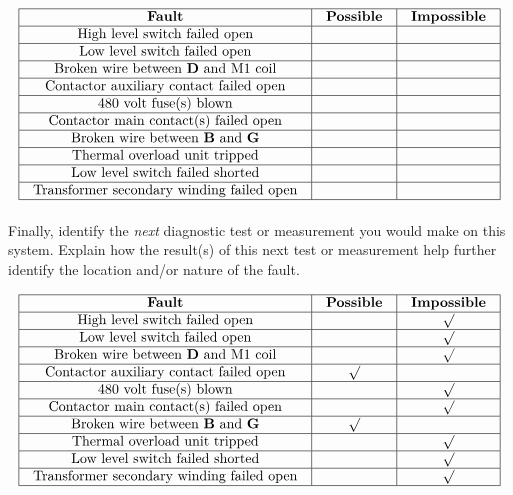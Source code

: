 $$\vbox{\offinterlineskip
\halign{\strut
\vrule \quad\hfil # \ \hfil & 
\vrule \quad\hfil # \ \hfil & 
\vrule \quad\hfil # \ \hfil \vrule \cr
\noalign{\hrule}
%
{\bf Fault} & {\bf Possible} & {\bf Impossible} \cr
%
\noalign{\hrule}
%
High level switch failed open &  &  \cr
%
\noalign{\hrule}
%
Low level switch failed open &  &  \cr
%
\noalign{\hrule}
%
Broken wire between {\bf D} and M1 coil &  &  \cr
%
\noalign{\hrule}
%
Contactor auxiliary contact failed open &  &  \cr
%
\noalign{\hrule}
%
480 volt fuse(s) blown &  &  \cr
%
\noalign{\hrule}
%
Contactor main contact(s) failed open &  &  \cr
%
\noalign{\hrule}
%
Broken wire between {\bf B} and {\bf G} &  &  \cr
%
\noalign{\hrule}
%
Thermal overload unit tripped &  &  \cr
%
\noalign{\hrule}
%
Low level switch failed shorted &  &  \cr
%
\noalign{\hrule}
%
Transformer secondary winding failed open &  &  \cr
%
\noalign{\hrule}
} %
}$$ %

Finally, identify the {\it next} diagnostic test or measurement you would make on this system.  Explain how the result(s) of this next test or measurement help further identify the location and/or nature of the fault.








$$\vbox{\offinterlineskip
\halign{\strut
\vrule \quad\hfil # \ \hfil & 
\vrule \quad\hfil # \ \hfil & 
\vrule \quad\hfil # \ \hfil \vrule \cr
\noalign{\hrule}
%
{\bf Fault} & {\bf Possible} & {\bf Impossible} \cr
%
\noalign{\hrule}
%
High level switch failed open &  & $\surd$ \cr
%
\noalign{\hrule}
%
Low level switch failed open &  & $\surd$ \cr
%
\noalign{\hrule}
%
Broken wire between {\bf D} and M1 coil &  & $\surd$ \cr
%
\noalign{\hrule}
%
Contactor auxiliary contact failed open & $\surd$ &  \cr
%
\noalign{\hrule}
%
480 volt fuse(s) blown &  & $\surd$ \cr
%
\noalign{\hrule}
%
Contactor main contact(s) failed open &  & $\surd$ \cr
%
\noalign{\hrule}
%
Broken wire between {\bf B} and {\bf G} & $\surd$ &  \cr
%
\noalign{\hrule}
%
Thermal overload unit tripped &  & $\surd$ \cr
%
\noalign{\hrule}
%
Low level switch failed shorted &  & $\surd$ \cr
%
\noalign{\hrule}
%
Transformer secondary winding failed open &  & $\surd$ \cr
%
\noalign{\hrule}
} %
}$$ %


